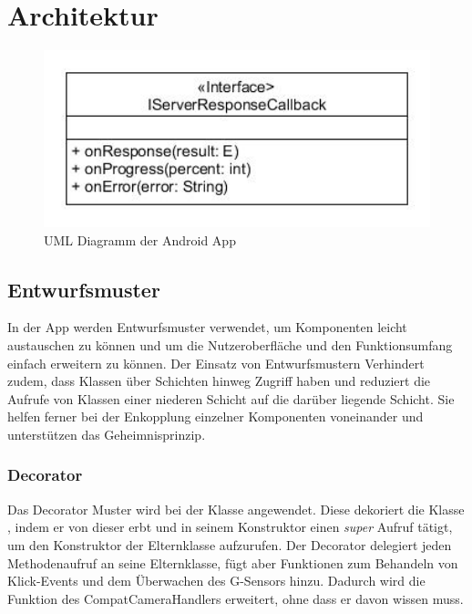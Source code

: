 \section{Architektur}

\begin{figure}[ht]
	\centering
\includegraphics[width=1\textwidth]{./resources/Diagramme/App/UMLAndroidApp.jpg}
\caption{UML Diagramm der Android App}
	\label{fig:modules_overview}
\end{figure}

\subsection{Entwurfsmuster}
In der App werden Entwurfsmuster verwendet, um Komponenten leicht austauschen zu können und um die Nutzeroberfläche und den Funktionsumfang einfach erweitern zu können. Der Einsatz von Entwurfsmustern Verhindert  zudem, dass Klassen über Schichten hinweg Zugriff haben und reduziert die Aufrufe von Klassen einer niederen Schicht auf die darüber liegende Schicht. Sie helfen ferner bei der Enkopplung einzelner Komponenten voneinander und unterstützen das Geheimnisprinzip.

\subsubsection{Decorator}
Das Decorator Muster wird bei der Klasse  angewendet. Diese dekoriert die Klasse , indem er von dieser erbt und in seinem Konstruktor einen \textit{super} Aufruf tätigt, um den Konstruktor der Elternklasse aufzurufen. Der Decorator delegiert jeden Methodenaufruf an seine Elternklasse, fügt aber Funktionen zum Behandeln von Klick-Events und dem Überwachen des G-Sensors hinzu.
Dadurch wird die Funktion des CompatCameraHandlers erweitert, ohne dass er davon wissen muss.

